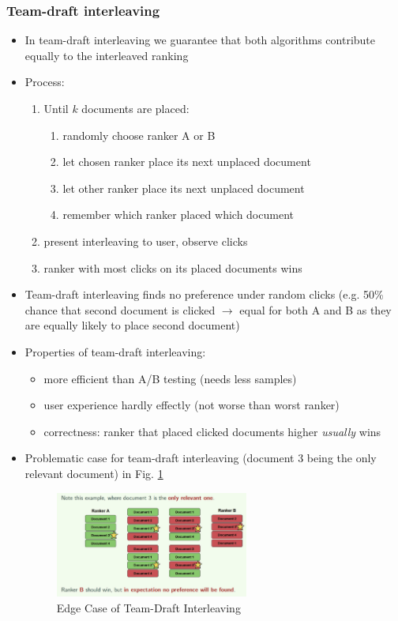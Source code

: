 \subsubsection{Team-draft interleaving}
\begin{itemize}
	\item In team-draft interleaving we guarantee that both algorithms contribute equally to the interleaved ranking
	\item Process:
	\begin{enumerate}
		\item Until $k$ documents are placed:
		\begin{enumerate}
			\item randomly choose ranker A or B
			\item let chosen ranker place its next unplaced document
			\item let other ranker place its next unplaced document
			\item remember which ranker placed which document
		\end{enumerate}
		\item present interleaving to user, observe clicks
		\item ranker with most clicks on its placed documents wins
	\end{enumerate}
	\item Team-draft interleaving finds no preference under random clicks (e.g. 50\% chance that second document is clicked $\rightarrow$ equal for both A and B as they are equally likely to place second document)
	\item Properties of team-draft interleaving: 
	\begin{itemize}
		\item more efficient than A/B testing (needs less samples)
		\item user experience hardly effectly (not worse than worst ranker)
		\item correctness: ranker that placed clicked documents higher \textit{usually} wins
	\end{itemize}
	\item Problematic case for team-draft interleaving (document 3 being the only relevant document) in Fig. \ref{img:team_draft_interleaving_problem}
	\begin{figure}[h!]
		\centering
		\includegraphics[width=0.6\textwidth]{figures/team_draft_interleaving_problem.png}
		\caption{Edge Case of Team-Draft Interleaving}
		\label{img:team_draft_interleaving_problem}
	\end{figure}
\end{itemize}
